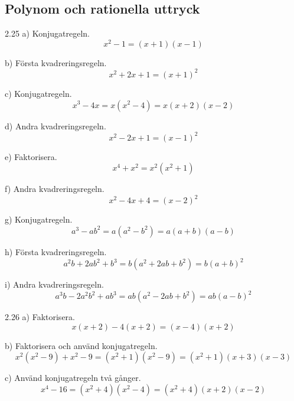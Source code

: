\subsection*{Polynom och rationella uttryck}

\begin{task}{2.25 a)}
	Konjugatregeln.
	\[x^2-1=(x+1)(x-1)\]
\end{task}

\begin{task}{b)}
	Första kvadreringsregeln.
	\[x^2+2x+1=(x+1)^2\]
\end{task}

\begin{task}{c)}
	Konjugatregeln.
	\[x^3-4x=x(x^2-4)=x(x+2)(x-2)\]
\end{task}

\begin{task}{d)}
	Andra kvadreringsregeln.
	\[x^2-2x+1=(x-1)^2\]
\end{task}

\begin{task}{e)}
	Faktorisera.
	\[x^4+x^2=x^2(x^2+1)\]
\end{task}

\begin{task}{f)}
	Andra kvadreringsregeln.
	\[x^2-4x+4=(x-2)^2\]
\end{task}

\begin{task}{g)}
	Konjugatregeln.
	\[a^3-ab^2=a(a^2-b^2)=a(a+b)(a-b)\]
\end{task}

\begin{task}{h)}
	Första kvadreringsregeln.
	\[a^2b+2ab^2+b^3=b(a^2+2ab+b^2)=b(a+b)^2\]
\end{task}

\begin{task}{i)}
	Andra kvadreringsregeln.
	\[a^3b-2a^2b^2+ab^3=ab(a^2-2ab+b^2)=ab(a-b)^2\]
\end{task}

\begin{task}{2.26 a)}
	Faktorisera.
	\[x(x+2)-4(x+2)=(x-4)(x+2)\]
\end{task}

\begin{task}{b)}
	Faktorisera och använd konjugatregeln.
	\[x^2(x^2-9)+x^2-9=(x^2+1)(x^2-9)=(x^2+1)(x+3)(x-3)\]
\end{task}

\begin{task}{c)}
	Använd konjugatregeln två gånger.
	\[x^4-16=(x^2+4)(x^2-4)=(x^2+4)(x+2)(x-2)\]
\end{task}

